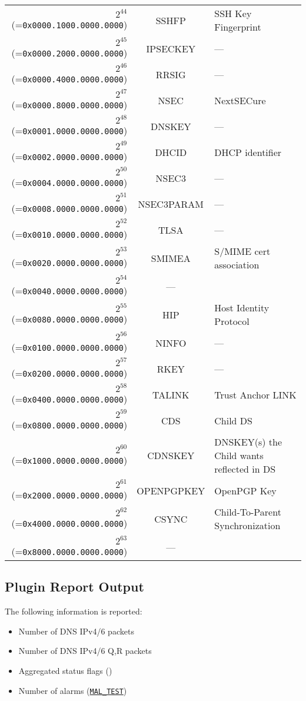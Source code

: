 \documentclass[documentation]{subfiles}
\begin{document}
\begin{longtable}{rcl}
    $2^{44}$ (={\tt 0x0000.1000.0000.0000}) & SSHFP & SSH Key Fingerprint \\
    $2^{45}$ (={\tt 0x0000.2000.0000.0000}) & IPSECKEY & --- \\
    $2^{46}$ (={\tt 0x0000.4000.0000.0000}) & RRSIG & --- \\
    $2^{47}$ (={\tt 0x0000.8000.0000.0000}) & NSEC & NextSECure \\
    $2^{48}$ (={\tt 0x0001.0000.0000.0000}) & DNSKEY & --- \\
    $2^{49}$ (={\tt 0x0002.0000.0000.0000}) & DHCID & DHCP identifier \\
    $2^{50}$ (={\tt 0x0004.0000.0000.0000}) & NSEC3 & --- \\
    $2^{51}$ (={\tt 0x0008.0000.0000.0000}) & NSEC3PARAM & --- \\
    $2^{52}$ (={\tt 0x0010.0000.0000.0000}) & TLSA & --- \\
    $2^{53}$ (={\tt 0x0020.0000.0000.0000}) & SMIMEA & S/MIME cert association \\
    $2^{54}$ (={\tt 0x0040.0000.0000.0000}) & --- & \\
    $2^{55}$ (={\tt 0x0080.0000.0000.0000}) & HIP & Host Identity Protocol \\
    $2^{56}$ (={\tt 0x0100.0000.0000.0000}) & NINFO & --- \\
    $2^{57}$ (={\tt 0x0200.0000.0000.0000}) & RKEY & --- \\
    $2^{58}$ (={\tt 0x0400.0000.0000.0000}) & TALINK & Trust Anchor LINK \\
    $2^{59}$ (={\tt 0x0800.0000.0000.0000}) & CDS & Child DS \\
    $2^{60}$ (={\tt 0x1000.0000.0000.0000}) & CDNSKEY & DNSKEY(s) the Child wants reflected in DS \\
    $2^{61}$ (={\tt 0x2000.0000.0000.0000}) & OPENPGPKEY & OpenPGP Key \\
    $2^{62}$ (={\tt 0x4000.0000.0000.0000}) & CSYNC & Child-To-Parent Synchronization \\
    $2^{63}$ (={\tt 0x8000.0000.0000.0000}) & --- & \\
    \bottomrule
\end{longtable}

\subsection{Plugin Report Output}
The following information is reported:
\begin{itemize}
    \item Number of DNS IPv4/6 packets
    \item Number of DNS IPv4/6 Q,R packets
    \item Aggregated status flags ({\tt{}})
    \item Number of alarms ({\tt\hyperref[dnsDecode:config]{MAL\_TEST}})
\end{itemize}
\end{document}
